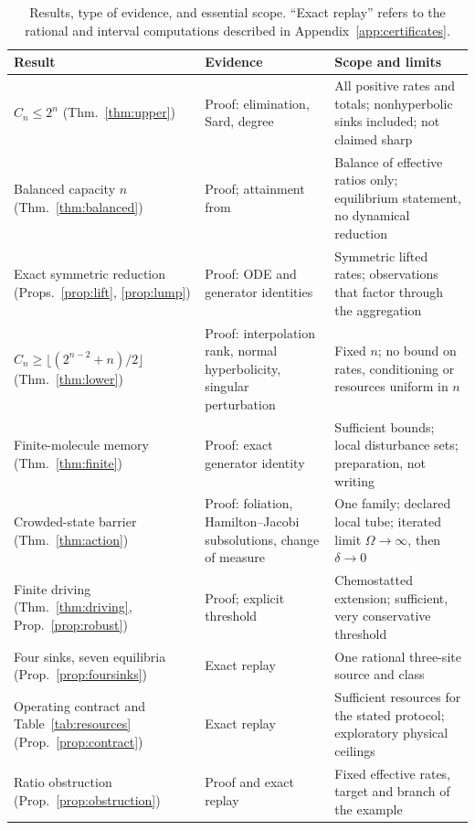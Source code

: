 \documentclass[11pt]{article}
\theoremstyle{plain}
\theoremstyle{definition}
\theoremstyle{remark}
\numberwithin{equation}{section}
\begin{document}
\begin{table}[tbp]
\centering\small
\caption{Results, type of evidence, and essential scope. ``Exact replay'' refers to the
rational and interval computations described in Appendix~\ref{app:certificates}.}
\label{tab:scope}
\begin{tabularx}{\textwidth}{@{}p{}p{}X@{}}
\toprule
Result & Evidence & Scope and limits\\
\midrule
\(C_n\le2^n\) (Thm.~\ref{thm:upper}) & Proof: elimination, Sard, degree & All positive
rates and totals; nonhyperbolic sinks included; not claimed sharp\\
Balanced capacity \(n\) (Thm.~\ref{thm:balanced}) & Proof; attainment from \cite{Companion} &
Balance of effective ratios only; equilibrium statement, no dynamical reduction\\
Exact symmetric reduction (Props.~\ref{prop:lift}, \ref{prop:lump}) & Proof: ODE and generator
identities & Symmetric lifted rates; observations that factor through the aggregation\\
\(C_n\ge\lfloor(2^{n-2}+n)/2\rfloor\) (Thm.~\ref{thm:lower}) & Proof: interpolation rank,
normal hyperbolicity, singular perturbation & Fixed \(n\); no bound on rates, conditioning or
resources uniform in \(n\)\\
Finite-molecule memory (Thm.~\ref{thm:finite}) & Proof: exact generator identity & Sufficient
bounds; local disturbance sets; preparation, not writing\\
Crowded-state barrier (Thm.~\ref{thm:action}) & Proof: foliation, Hamilton--Jacobi
subsolutions, change of measure & One family; declared local tube; iterated limit
\(\Omega\to\infty\), then \(\delta\to0\)\\
Finite driving (Thm.~\ref{thm:driving}, Prop.~\ref{prop:robust}) & Proof; explicit threshold &
Chemostatted extension; sufficient, very conservative threshold\\
Four sinks, seven equilibria (Prop.~\ref{prop:foursinks}) & Exact replay & One rational
three-site source and class\\
Operating contract and Table~\ref{tab:resources} (Prop.~\ref{prop:contract}) & Exact replay &
Sufficient resources for the stated protocol; exploratory physical ceilings\\
Ratio obstruction (Prop.~\ref{prop:obstruction}) & Proof and exact replay & Fixed effective
rates, target and branch of the example\\
\bottomrule
\end{tabularx}
\end{table}
\end{document}
